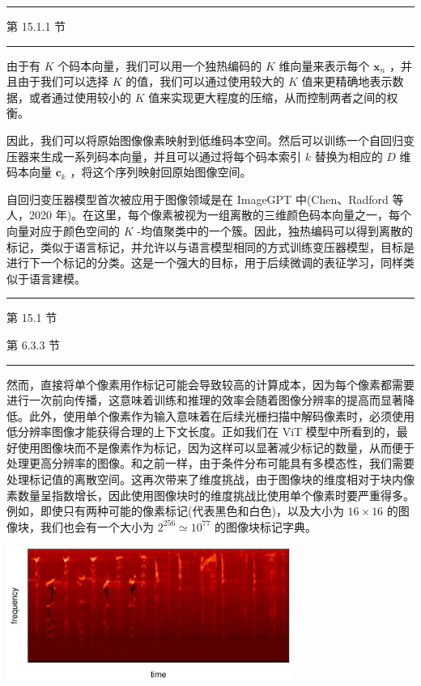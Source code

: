 \documentclass[10pt]{article}
\newcommand{\HRule}{\begin{center}\rule{0.9\linewidth}{0.2mm}\end{center}}
\begin{document}
\HRule

第 15.1.1 节

\HRule

由于有 \(K\) 个码本向量，我们可以用一个独热编码的 \(K\) 维向量来表示每个 \({\mathbf{x}}_{n}\) ，并且由于我们可以选择 \(K\) 的值，我们可以通过使用较大的 \(K\) 值来更精确地表示数据，或者通过使用较小的 \(K\) 值来实现更大程度的压缩，从而控制两者之间的权衡。

因此，我们可以将原始图像像素映射到低维码本空间。然后可以训练一个自回归变压器来生成一系列码本向量，并且可以通过将每个码本索引 \(k\) 替换为相应的 \(D\) 维码本向量 \({\mathbf{c}}_{k}\) ，将这个序列映射回原始图像空间。

自回归变压器模型首次被应用于图像领域是在 ImageGPT 中(Chen、Radford 等人，2020 年)。在这里，每个像素被视为一组离散的三维颜色码本向量之一，每个向量对应于颜色空间的 \(K\) -均值聚类中的一个簇。因此，独热编码可以得到离散的标记，类似于语言标记，并允许以与语言模型相同的方式训练变压器模型，目标是进行下一个标记的分类。这是一个强大的目标，用于后续微调的表征学习，同样类似于语言建模。

\HRule

第 15.1 节

第 6.3.3 节

\HRule

然而，直接将单个像素用作标记可能会导致较高的计算成本，因为每个像素都需要进行一次前向传播，这意味着训练和推理的效率会随着图像分辨率的提高而显著降低。此外，使用单个像素作为输入意味着在后续光栅扫描中解码像素时，必须使用低分辨率图像才能获得合理的上下文长度。正如我们在 ViT 模型中所看到的，最好使用图像块而不是像素作为标记，因为这样可以显著减少标记的数量，从而便于处理更高分辨率的图像。和之前一样，由于条件分布可能具有多模态性，我们需要处理标记值的离散空间。这再次带来了维度挑战，由于图像块的维度相对于块内像素数量呈指数增长，因此使用图像块时的维度挑战比使用单个像素时要严重得多。例如，即使只有两种可能的像素标记(代表黑色和白色)，以及大小为 \({16} \times  {16}\) 的图像块，我们也会有一个大小为 \({2}^{256} \simeq  {10}^{77}\) 的图像块标记字典。

\begin{center}
\includegraphics[max width=0.7\textwidth]{images/0194e279-9b28-703a-88f4-c3ac21e2010d_418_567_349_933_436_0.jpg}
\end{center}
\hspace*{3em} 
\end{document}
